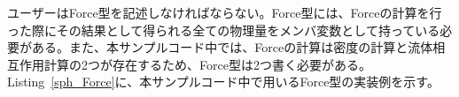 ユーザーはForce型を記述しなければならない。Force型には、Forceの計算を行った際にその結果として得られる全ての物理量をメンバ変数として持っている必要がある。また、本サンプルコード中では、Forceの計算は密度の計算と流体相互作用計算の2つが存在するため、Force型は2つ書く必要がある。Listing~\ref{sph_Force}に、本サンプルコード中で用いるForce型の実装例を示す。

\ifCpp %

\endifCpp
\ifFtn %

\endifFtn
\ifC %

\endifC

